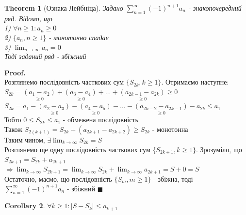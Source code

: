 \documentclass[a4paper, 14pt]{extarticle}
\def\huge{\displaystyle}
\theoremstyle{theoremdd}
\newtheorem{theorem}{Theorem}[subsection]
\theoremstyle{theoremdd}
\theoremstyle{theoremdd}
\theoremstyle{theoremdd}
\theoremstyle{theoremdd}
\theoremstyle{theoremdd}
\theoremstyle{theoremdd}
\theoremstyle{theoremdd}
\newtheorem{corollary}[theorem]{Corollary}
\newenvironment{pf}{\vspace*{-3mm} \textbf{Proof. \\}}{$\blacksquare$}
\begin{document}
\begin{theorem}[Ознака Лейбніца]
Задано  $\huge \sum_{n=1}^\infty (-1)^{n+1}a_n$ - знакопочередний ряд. Відомо, що\\
1) $\forall n \geq 1: a_n \geq 0$\\
2) $\{a_n, n \geq 1 \}$ - монотонно спадає\\
3) $\huge \lim_{n \to \infty} a_n = 0$\\
Тоді заданий ряд - збіжний
\end{theorem}

\begin{pf}
Розглянемо послідовність часткових сум $\{S_{2k}, k \geq 1 \}$. Отримаємо наступне:\\
$S_{2k} = \underset{\geq 0}{(a_1 - a_2)} + \underset{\geq 0}{(a_3 - a_4)} + \dots + \underset{\geq 0}{(a_{2k-1} - a_{2k})} \geq 0$\\
$S_{2k} = a_1 - \underset{\geq 0}{(a_2 - a_3)} - \underset{\geq 0}{(a_4 - a_5)} - \dots - \underset{\geq 0}{(a_{2k-2} - a_{2k-1})} - a_{2k} \leq a_1$\\
Тобто $0 \leq S_{2k} \leq a_1$ - обмежена послідовність\\
Також $S_{2(k+1)} = S_{2k} + (a_{2k+1}-a_{2k+2}) \geq S_{2k}$ - монотонна\\
Таким чином, $\exists \huge \lim_{k \to \infty} S_{2k} = S$\\
Розглянемо ще одну послідовність часткових сум $\{S_{2k+1}, k \geq 1\}$. Зрозуміло, що\\
$S_{2k+1} = S_{2k} + a_{2k+1}$\\
$\Rightarrow \huge \lim_{k \to \infty} S_{2k+1} = \lim_{k \to \infty} S_{2k} + \lim_{k \to \infty} a_{2k+1} = S + 0 = S$\\
Остаточно, маємо, що послідовність $\{S_m, m \geq 1\}$ - збіжна, тоді\\
$\huge \sum_{n=1}^\infty (-1)^{n+1}a_n$ - збіжний
\end{pf}


\begin{corollary}
$\forall k \geq 1: |S-S_k| \leq a_{k+1}$
\end{corollary}
\end{document}
